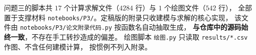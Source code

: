 \documentclass[withoutpreface, bwprint]{cumcmthesis}
\begin{document}
\begin{appendices}












问题三的脚本共 $17$ 个计算求解文件（$4284$ 行）与 $1$ 个绘图文件（$542$ 行），
全部置于支撑材料 \verb|notebooks/P3/|。定稿版的附录只收建模与求解的核心实现，
该文件由 \verb|notebooks/P3/论文附录代码.py| 按函数名自动抽取生成，
\textbf{与仓库中的源码始终一致}，不存在手工转抄造成的偏差。
绘图脚本 \verb|绘图.py| 只读取 \verb|results/*.csv| 作图、不含任何建模计算，
按惯例不列入附录。


\end{appendices}
\end{document}
